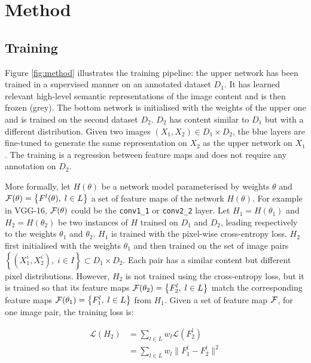 \documentclass{bmvc2k}
\begin{document}
\section{Method}

\subsection{Training}
Figure \ref{fig:method} illustrates the training pipeline: the upper network
has been trained in a supervised manner on an annotated dataset $D_1$. 
It has learned relevant high-level semantic representations of the image 
content and is then frozen (grey). The bottom network is initialised with the
weights of the upper one and is trained on  
the second dataset $D_2$. $D_2$ has content similar to $D_1$ but with a different 
distribution. Given two images $(X_1, X_2) \in D_1 \times D_2$,  
the blue layers are fine-tuned to generate the same representation 
on $X_2$ as the upper network on $X_1$. 
The training is a regression between feature maps and does not require 
any annotation on $D_2$. 

More formally, let $H(\theta)$ be a network model parameterised by weights
$\theta$ and ${\cal F}(\theta) = \left\{F^l(\theta), \;l \in L\right\}$ a set 
of feature maps of the network $H(\theta)$. 
For example in VGG-16, ${\cal F}(\theta)$ could be the {\tt conv1\_1} or {\tt conv2\_2} layer. 
Let $H_1 = H(\theta_1)$ and $H_2 = H(\theta_2)$ be two instances of $H$ trained on $D_1$ 
and $D_2$, leading respectively to the weights $\theta_1$ and $\theta_2$. 
$H_1$ is trained with the pixel-wise cross-entropy loss. 
$H_2$ first initialised with the weights $\theta_1$ and then trained on the set of image pairs 
$\left\{(X_1^i, X_2^i), \; i \in I\right\} \subset D_1 \times D_2$. Each pair has a similar content but 
different pixel distributions. However, $H_2$ is not trained using the cross-entropy
loss, but it is trained so that its feature maps 
${\cal F}(\theta_2) = \left\{F^l_2,\;l \in L\right\}$
match the corresponding feature maps ${\cal F}(\theta_1)=\left\{F^l_1,\;l \in L\right\}$ from $H_1$. 
Given a set of feature map ${\cal F}$, for one image pair, the training loss is:

\begin{equation}
  \begin{split}
    \mathcal{L}(H_2)  & = \sum_{l \in L}{w_l \mathcal{L}(F^l_2)}\\
                              & = \sum_{l \in L}{ w_l \| F^l_1 - F^l_2 \|^2}
  \end{split}
\end{equation}
\end{document}
